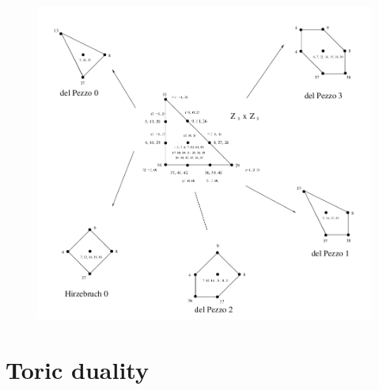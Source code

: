         \begin{figure}
            \centering
            \includegraphics[scale=0.4]{Pictures/delPezzo.png}
        \end{figure}

\section{Toric duality}

